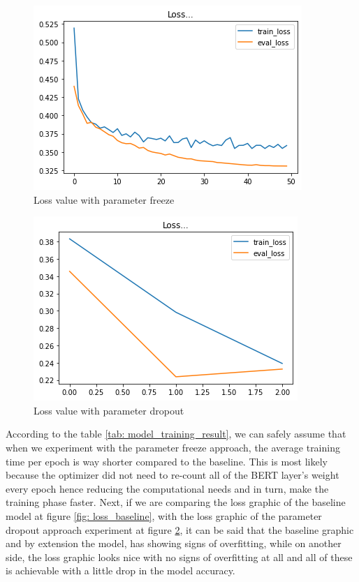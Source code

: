 \begin{figure}[h]
  \begin{center}
    \includegraphics[width= 0.9\linewidth]{gambar/loss_freeze_50.png}
    \caption{Loss value with parameter freeze}
    \label{fig: loss_freeze}
  \end{center}
\end{figure}

\begin{figure}[h]
  \begin{center}
    \includegraphics[width= 0.9\linewidth]{gambar/loss_dropout_new.png}
    \caption{Loss value with parameter dropout}
    \label{fig: loss_dropout}
  \end{center}
\end{figure}

According to the table \ref{tab: model_training_result}, we can safely assume that when we experiment with the parameter freeze approach, the average training time per epoch is way shorter compared to the baseline. This is most likely because the optimizer did not need to re-count all of the BERT layer's weight every epoch hence reducing the computational needs and in turn, make the training phase faster. Next, if we are comparing the loss graphic of the baseline model at figure \ref{fig: loss_baseline}, with the loss graphic of the parameter dropout approach experiment at figure \ref{fig: loss_dropout}, it can be said that the baseline graphic and by extension the model, has showing signs of overfitting, while on another side, the loss graphic looks nice with no signs of overfitting at all and all of these is achievable with a little drop in the model accuracy.